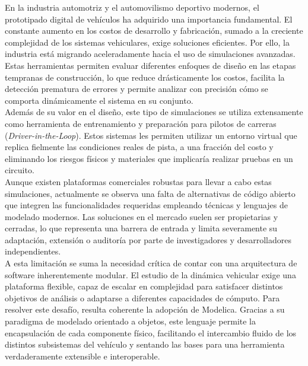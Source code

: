 En la industria automotriz y el automovilismo deportivo modernos, el prototipado digital de vehículos ha adquirido una importancia fundamental. El constante aumento en los costos de desarrollo y fabricación, sumado a la creciente complejidad de los sistemas vehiculares, exige soluciones eficientes. Por ello, la industria está migrando aceleradamente hacia el uso de simulaciones avanzadas. Estas herramientas permiten evaluar diferentes enfoques de diseño en las etapas tempranas de construcción, lo que reduce drásticamente los costos, facilita la detección prematura de errores y permite analizar con precisión cómo se comporta dinámicamente el sistema en su conjunto.\\

Además de su valor en el diseño, este tipo de simulaciones se utiliza extensamente como herramienta de entrenamiento y preparación para pilotos de carreras (\textit{Driver-in-the-Loop}). Estos sistemas les permiten utilizar un entorno virtual que replica fielmente las condiciones reales de pista, a una fracción del costo y eliminando los riesgos físicos y materiales que implicaría realizar pruebas en un circuito.\\

Aunque existen plataformas comerciales robustas para llevar a cabo estas simulaciones, actualmente se observa una falta de alternativas de código abierto que integren las funcionalidades requeridas empleando técnicas y lenguajes de modelado modernos. Las soluciones en el mercado suelen ser propietarias y cerradas, lo que representa una barrera de entrada y limita severamente su adaptación, extensión o auditoría por parte de investigadores y desarrolladores independientes.\\

A esta limitación se suma la necesidad crítica de contar con una arquitectura de software inherentemente modular. El estudio de la dinámica vehicular exige una plataforma flexible, capaz de escalar en complejidad para satisfacer distintos objetivos de análisis o adaptarse a diferentes capacidades de cómputo. Para resolver este desafío, resulta coherente la adopción de Modelica. Gracias a su paradigma de modelado orientado a objetos, este lenguaje permite la encapsulación de cada componente físico, facilitando el intercambio fluido de los distintos subsistemas del vehículo y sentando las bases para una herramienta verdaderamente extensible e interoperable.\\

